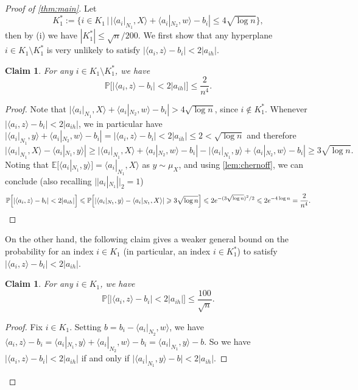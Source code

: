 \documentclass[reqno]{amsart}
\newtheorem{claim}[theorem]{Claim}
\theoremstyle{remark}
\theoremstyle{definition}
\numberwithin{theorem}{section}
\renewcommand{\(}{\bigl(}
\renewcommand{\)}{\bigr)\vphantom{)}}
\newcommand{\E}{\mathbb{E}}
\renewcommand{\le}{\leqslant}
\renewcommand{\ge}{\geqslant}
\renewcommand{\P}{\mathbb{P}}
\newcommand{\ang}[1]{\langle#1\rangle}
\begin{document}
\begin{proof}[Proof of \cref{thm:main}]
Let 
\[K_1^*:= \Big\{i\in K_1 \,\Big|\, |\ang{a_i|_{N_1},X}+\ang{a_i|_{N_2},w}- b_i| \le 4\sqrt{\log n}\Big\},\] 
then by (i) we have $|K_1^*|\le \sqrt{n}/200$. We first show that any hyperplane $i\in K_1\setminus K_1^*$ is very unlikely to satisfy $|\ang{a_i,z} - b_i|< 2|a_{ih}|$.


\begin{claim}\label{claim:prob-far-hyperplane-slice}
    For any $i\in K_1\setminus K_1^*$, we have 
    \[\P\Big[|\ang{a_i,z} - b_i|< 2|a_{ih}|\Big]\le \frac{2}{n^4}.\]
\end{claim}

\begin{proof}
Note that $|\ang{a_i|_{N_1},X}+\ang{a_i|_{N_2},w}- b_i| > 4\sqrt{\log n}$, since $i\not\in K_1^*$. Whenever $|\ang{a_i,z} - b_i|< 2|a_{ih}|$, we in particular have $|\ang{a_i|_{N_1},y}+\ang{a_i|_{N_2},w}- b_i|=|\ang{a_i,z} - b_i|< 2|a_{ih}|\le 2<\sqrt{\log n}$ and therefore
\[| \ang{a_i|_{N_1},X}-\ang{a_i|_{N_1},y}| \ge |\ang{a_i|_{N_1},X}+\ang{a_i|_{N_2},w}- b_i|-|\ang{a_i|_{N_1},y}+\ang{a_i|_{N_2},w}- b_i|\ge 3\sqrt{\log n}.\]
Noting that $\E[\ang{a_i|_{N_1},y}]=\ang{a_i|_{N_1},X}$ as $y\sim \mu_X$, and using \cref{lem:chernoff}, we can conclude (also recalling $||a_i|_{N_1}||_2 = 1$)
    \[
        \P\Big[|\ang{a_i,z} - b_i|< 2|a_{ih}|\Big]\le \P\Big[| \ang{a_i|_{N_1},y}-\ang{a_i|_{N_1},X}|\ge 3\sqrt{\log n}\Big] \le 2e^{-(3\sqrt{\log n})^2/2} \le 2e^{-4\log n} = \frac{2}{n^4}. \qedhere
    \]
\end{proof}

On the other hand, the following claim gives a weaker general bound on the probability for an index $i\in K_1$ (in particular, an index $i\in K_1^*$) to satisfy $|\ang{a_i,z} - b_i|< 2|a_{ih}|$.

\begin{claim}\label{claim:prob-close-hyperplane-slice}
    For any $i\in K_1$, we have
    \[\P\Big[|\ang{a_i,z} - b_i|< 2|a_{ih}|\Big]\le \frac{100}{\sqrt{n}}.\]
\end{claim}

\begin{proof}
Fix $i\in K_1$. Setting $b = b_i - \ang{a_i|_{N_2}, w}$, we have $\ang{a_i,z} - b_i=\ang{a_i|_{N_1}, y}+\ang{a_i|_{N_2}, w}-b_i=\ang{a_i|_{N_1}, y}-b$. So we have $|\ang{a_i,z} - b_i|< 2|a_{ih}|$ if and only if $|\ang{a_i|_{N_1}, y}-b|< 2|a_{ih}|$.


\end{proof}
\end{proof}
\end{document}
